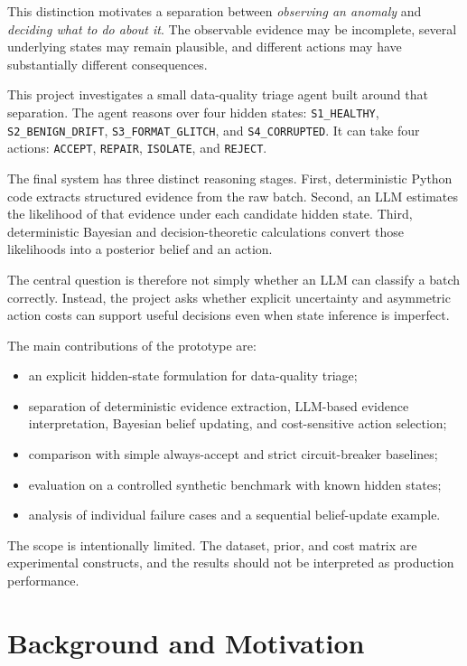 \documentclass{article}
\begin{document}
This distinction motivates a separation between \emph{observing an anomaly} and \emph{deciding what to do about it}. The observable evidence may be incomplete, several underlying states may remain plausible, and different actions may have substantially different consequences.

This project investigates a small data-quality triage agent built around that separation. The agent reasons over four hidden states:
\texttt{S1\_HEALTHY},
\texttt{S2\_BENIGN\_DRIFT},
\texttt{S3\_FORMAT\_GLITCH}, and
\texttt{S4\_CORRUPTED}.
It can take four actions:
\texttt{ACCEPT},
\texttt{REPAIR},
\texttt{ISOLATE}, and
\texttt{REJECT}.

The final system has three distinct reasoning stages. First, deterministic Python code extracts structured evidence from the raw batch. Second, an LLM estimates the likelihood of that evidence under each candidate hidden state. Third, deterministic Bayesian and decision-theoretic calculations convert those likelihoods into a posterior belief and an action.

The central question is therefore not simply whether an LLM can classify a batch correctly. Instead, the project asks whether explicit uncertainty and asymmetric action costs can support useful decisions even when state inference is imperfect.

The main contributions of the prototype are:

\begin{itemize}
    \item an explicit hidden-state formulation for data-quality triage;
    \item separation of deterministic evidence extraction, LLM-based evidence interpretation, Bayesian belief updating, and cost-sensitive action selection;
    \item comparison with simple always-accept and strict circuit-breaker baselines;
    \item evaluation on a controlled synthetic benchmark with known hidden states;
    \item analysis of individual failure cases and a sequential belief-update example.
\end{itemize}

The scope is intentionally limited. The dataset, prior, and cost matrix are experimental constructs, and the results should not be interpreted as production performance.


\section{Background and Motivation}
\end{document}
